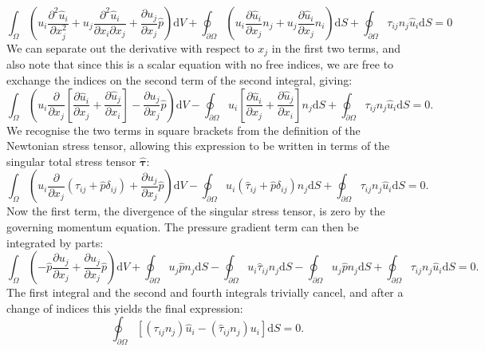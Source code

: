 \documentclass[12pt,a4paper]{article}
\numberwithin{equation}{section}
\newcommand{\D}{\mathrm{d}}
\begin{document}
\begin{equation}
  \int_{\Omega} \left(u_i\frac{\partial^2\hat u_i}{\partial x_j^2} + u_j\frac{\partial^2\hat u_i}{\partial x_i\partial x_j} + \frac{\partial u_j}{\partial x_j}\hat p\right) \D V + \oint_{\partial\Omega}\left( u_i\frac{\partial\hat u_i}{\partial x_j}n_j + u_j\frac{\partial\hat u_i}{\partial x_j}n_i  \right) \D S + \oint_{\partial\Omega}\tau_{ij}n_j\hat u_i\D S = 0
\end{equation}
We can separate out the derivative with respect to $x_j$ in the first two terms, and also note that since this is a scalar equation with no free indices, we are free to exchange the indices on the second term of the second integral, giving:
\begin{equation}
  \int_{\Omega}\left( u_i\frac{\partial}{\partial x_j}\left[\frac{\partial \hat u_i}{\partial x_j} + \frac{\partial \hat u_j}{\partial x_i}\right] - \frac{\partial u_j}{\partial x_j}\hat p \right)\D V - \oint_{\partial\Omega}u_i\left[\frac{\partial \hat u_i}{\partial x_j} + \frac{\partial\hat u_j}{\partial x_i}\right]n_j\D S + \oint_{\partial\Omega}\tau_{ij}n_j\hat u_i\D S = 0.
\end{equation}
We recognise the two terms in square brackets from the definition of the Newtonian stress tensor, allowing this expression to be written in terms of the singular total stress tensor $\bm{\hat \tau}$:
\begin{equation}
  \int_{\Omega}\left( u_i\frac{\partial}{\partial x_j}(\hat\tau_{ij} + \hat p\delta_{ij}) + \frac{\partial u_j}{\partial x_j}\hat p \right)\D V - \oint_{\partial\Omega}u_i( \hat\tau_{ij} + \hat p\delta_{ij} ) n_j\D S + \oint_{\partial\Omega}\tau_{ij}n_j\hat u_i\D S = 0.
\end{equation}
Now the first term, the divergence of the singular stress tensor, is zero by the governing momentum equation. The pressure gradient term can then be integrated by parts:
\begin{equation}
  \int_{\Omega} \left(-\hat p\frac{\partial u_j}{\partial x_j} + \frac{\partial u_j}{\partial x_j}\hat p \right)\D V +\oint_{\partial\Omega}u_j\hat p n_j \D S - \oint_{\partial\Omega} u_i\hat\tau_{ij}n_j\D S - \oint_{\partial\Omega}u_j\hat p n_j \D S  + \oint_{\partial\Omega}\tau_{ij}n_j\hat u_i\D S = 0.
\end{equation}
The first integral and the second and fourth integrals trivially cancel, and after a change of indices this yields the final expression:
\begin{equation}
  \oint_{\partial\Omega}\left[ (\tau_{ij}n_j)\hat u_i - (\hat\tau_{ij}n_j) u_i \right] \D S = 0.
\end{equation}
\end{document}
